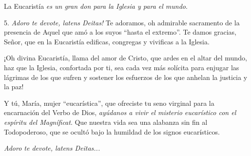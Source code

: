 			\begin{body}La Eucaristía \textit{es un gran don para la Iglesia y para el mundo}. \begin{bodysmall}\end{bodysmall}\end{body}
			
			\begin{body}5.\textit{ Adoro te devote, latens Deitas!} Te adoramos, oh admirable sacramento de la presencia de Aquel que amó a los suyos “hasta el extremo”. Te damos gracias, Señor, que en la Eucaristía edificas, congregas y vivificas a la Iglesia.\end{body}
			
			\begin{body}¡Oh divina Eucaristía, llama del amor de Cristo, que ardes en el altar del mundo, haz que la Iglesia, confortada por ti, sea cada vez más solícita para enjugar las lágrimas de los que sufren y sostener los esfuerzos de los que anhelan la justicia y la paz!\end{body}
			
			\begin{body}Y tú, María, mujer “eucarística”, que ofreciste tu seno virginal para la encarnación del Verbo de Dios, \textit{ayúdanos a vivir el misterio eucarístico con el espíritu del Magníficat}. Que nuestra vida sea una alabanza sin fin al Todopoderoso, que se ocultó bajo la humildad de los signos eucarísticos.\end{body}
			
			\begin{body}\textit{Adoro te devote, latens Deitas...}\end{body}
			
